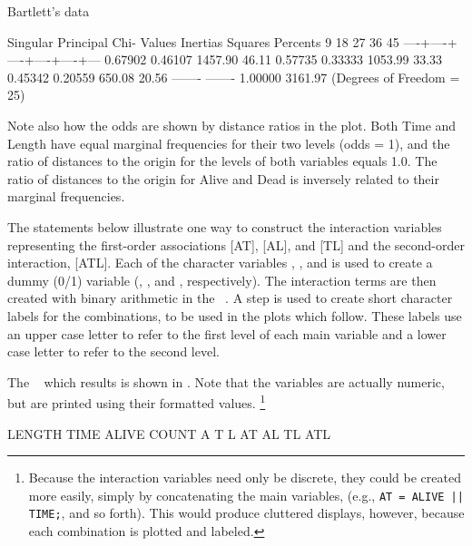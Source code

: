\begin{Example}[bartlett]{Bartlett's data}
\begin{Output}[htb]
\begin{output}
        Singular  Principal Chi-
        Values    Inertias  Squares Percents    9   18   27   36   45
                                            ----+----+----+----+----+---
        0.67902   0.46107   1457.90  46.11%
        0.57735   0.33333   1053.99  33.33%
        0.45342   0.20559    650.08  20.56%
                  -------   -------
                  1.00000   3161.97 (Degrees of Freedom = 25)
\end{output}
\end{Output}
Note also how the odds are shown by distance ratios in the plot.
Both Time and Length have equal marginal frequencies for their two
levels (odds = 1), and the ratio of distances to the origin for
the levels of both variables equals 1.0.
The ratio of distances to the origin for Alive and Dead
is inversely related to their marginal frequencies.

The statements below illustrate one way to construct the interaction
variables representing the first-order associations [AT], [AL], and [TL]
and the second-order interaction, [ATL].
Each of the character variables , ,
and  is used to create a dummy (0/1) variable
(, , and , respectively).
The interaction terms are then created with binary arithmetic
in the \Dstp\ .
A  step is used to create short character labels for the
combinations, to be used in the plots which follow.
These labels use an upper case letter to refer to the first level of
each main variable and a lower case letter to refer to the second level.

The \Dset\  which results is shown in .
Note that the variables  are actually numeric, but are printed
using their formatted values.%
\footnote{Because the interaction
variables need only be discrete, they could be created more easily, simply
by concatenating the main variables,
(e.g., \texttt{AT = ALIVE || TIME;}, and so forth).  This would produce
cluttered displays, however, because each combination is plotted and labeled.}
%

\begin{Output}[htb]
\caption{\Dset\ : Interactive coding for Bartlett's data, Extended MCA}\label{out:mcabart2}
\begin{output}
   LENGTH    TIME      ALIVE    COUNT    A    T    L    AT    AL    TL    ATL


\end{output}
\end{Output}
\end{Example}

